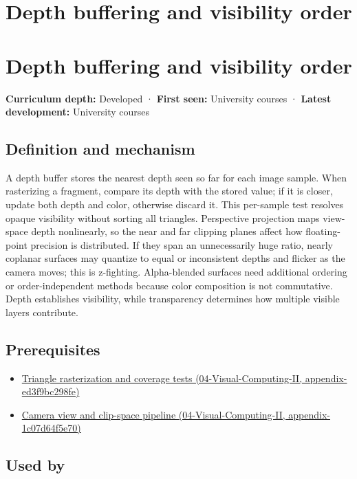 \hypertarget{appendix-97578ed97952}{}
\section*{Depth buffering and visibility order}
\section{Depth buffering and visibility order}\label{depth-buffering-and-visibility-order}

\textbf{Curriculum depth:} Developed · \textbf{First seen:} University courses · \textbf{Latest development:} University courses

\subsection{Definition and mechanism}\label{definition-and-mechanism}

A depth buffer stores the nearest depth seen so far for each image sample. When rasterizing a fragment, compare its depth with the stored value; if it is closer, update both depth and color, otherwise discard it. This per-sample test resolves opaque visibility without sorting all triangles. Perspective projection maps view-space depth nonlinearly, so the near and far clipping planes affect how floating-point precision is distributed. If they span an unnecessarily huge ratio, nearly coplanar surfaces may quantize to equal or inconsistent depths and flicker as the camera moves; this is z-fighting. Alpha-blended surfaces need additional ordering or order-independent methods because color composition is not commutative. Depth establishes visibility, while transparency determines how multiple visible layers contribute.

\subsection{Prerequisites}\label{prerequisites}

\begin{itemize}
\tightlist
\item
  \href{}{Triangle rasterization and coverage tests (04-Visual-Computing-II, appendix-ed3f9bc298fe)}
\item
  \href{}{Camera view and clip-space pipeline (04-Visual-Computing-II, appendix-1c07d64f5e70)}
\end{itemize}

\subsection{Used by}\label{used-by}

